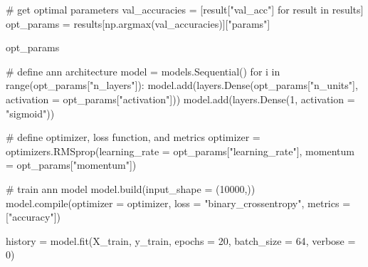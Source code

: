 \documentclass[
  letterpaper,
  DIV=11,
  numbers=noendperiod]{scrreprt}
\newenvironment{Shaded}{\begin{snugshade}}{\end{snugshade}}
\newcommand{\BuiltInTok}[1]{\textcolor[rgb]{0.00,0.23,0.31}{#1}}
\newcommand{\CommentTok}[1]{\textcolor[rgb]{0.37,0.37,0.37}{#1}}
\newcommand{\ControlFlowTok}[1]{\textcolor[rgb]{0.00,0.23,0.31}{#1}}
\newcommand{\DecValTok}[1]{\textcolor[rgb]{0.68,0.00,0.00}{#1}}
\newcommand{\KeywordTok}[1]{\textcolor[rgb]{0.00,0.23,0.31}{#1}}
\newcommand{\NormalTok}[1]{\textcolor[rgb]{0.00,0.23,0.31}{#1}}
\newcommand{\OperatorTok}[1]{\textcolor[rgb]{0.37,0.37,0.37}{#1}}
\newcommand{\StringTok}[1]{\textcolor[rgb]{0.13,0.47,0.30}{#1}}
\begin{document}
\begin{Shaded}
\begin{Highlighting}[]
\CommentTok{\# get optimal parameters}
\NormalTok{val\_accuracies }\OperatorTok{=}\NormalTok{ [result[}\StringTok{"val\_acc"}\NormalTok{] }\ControlFlowTok{for}\NormalTok{ result }\KeywordTok{in}\NormalTok{ results]}
\NormalTok{opt\_params     }\OperatorTok{=}\NormalTok{ results[np.argmax(val\_accuracies)][}\StringTok{"params"}\NormalTok{]}

\NormalTok{opt\_params}
\end{Highlighting}
\end{Shaded}

\begin{Shaded}
\begin{Highlighting}[]
\CommentTok{\# define ann architecture}
\NormalTok{model }\OperatorTok{=}\NormalTok{ models.Sequential()}
\ControlFlowTok{for}\NormalTok{ i }\KeywordTok{in} \BuiltInTok{range}\NormalTok{(opt\_params[}\StringTok{"n\_layers"}\NormalTok{]):}
\NormalTok{    model.add(layers.Dense(opt\_params[}\StringTok{"n\_units"}\NormalTok{], activation }\OperatorTok{=}\NormalTok{ opt\_params[}\StringTok{"activation"}\NormalTok{]))}
\NormalTok{model.add(layers.Dense(}\DecValTok{1}\NormalTok{, activation }\OperatorTok{=} \StringTok{"sigmoid"}\NormalTok{))}

\CommentTok{\# define optimizer, loss function, and metrics}
\NormalTok{optimizer }\OperatorTok{=}\NormalTok{ optimizers.RMSprop(learning\_rate }\OperatorTok{=}\NormalTok{ opt\_params[}\StringTok{"learning\_rate"}\NormalTok{], }
\NormalTok{                               momentum }\OperatorTok{=}\NormalTok{ opt\_params[}\StringTok{"momentum"}\NormalTok{])}

\CommentTok{\# train ann model}
\NormalTok{model.build(input\_shape }\OperatorTok{=}\NormalTok{ (}\DecValTok{10000}\NormalTok{,))}
\NormalTok{model.}\BuiltInTok{compile}\NormalTok{(optimizer }\OperatorTok{=}\NormalTok{ optimizer, loss }\OperatorTok{=} \StringTok{"binary\_crossentropy"}\NormalTok{, metrics }\OperatorTok{=}\NormalTok{ [}\StringTok{"accuracy"}\NormalTok{])}

\NormalTok{history }\OperatorTok{=}\NormalTok{ model.fit(X\_train, y\_train, epochs }\OperatorTok{=} \DecValTok{20}\NormalTok{, batch\_size }\OperatorTok{=} \DecValTok{64}\NormalTok{, verbose }\OperatorTok{=} \DecValTok{0}\NormalTok{)}
\end{Highlighting}
\end{Shaded}
\end{document}
